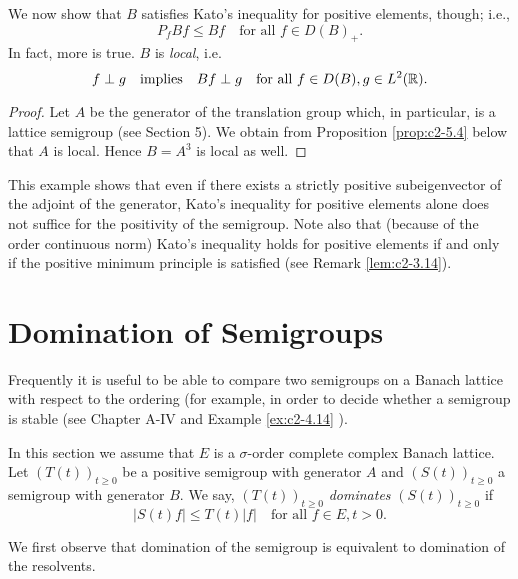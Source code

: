 We now show that $B$ satisfies Kato's inequality for positive elements, though; i.e.,
\begin{equation}\label{eq:c2-3.20}
P_{f} Bf \leq Bf \quad \text{for all } f \in D(B)_{+}.
\end{equation}
In fact, more is true. $B$ is \emph{local}, i.e.
\begin{equation}\label{eq:c2-3.21}
f \perp g \quad \text{implies} \quad Bf \perp g \quad \text{for all } f \in D(B), g \in L^{2}(\mathbb{R}).
\end{equation}

\begin{proof}
Let $A$ be the generator of the translation group which, in particular, is a lattice semigroup (see Section 5). We obtain from Proposition \ref{prop:c2-5.4} below that $A$ is local. 
Hence $B = A^{3}$ is local as well.
\end{proof}
This example shows that even if there exists a strictly positive subeigenvector of the adjoint of the generator, Kato's inequality for positive elements alone does not suffice for the positivity of the semigroup. 
Note also that (because of the order continuous norm) Kato's inequality holds for positive elements if and only if the positive minimum principle is satisfied (see Remark \ref{lem:c2-3.14}).

\section{Domination of Semigroups} \label{sec:c2-4}

Frequently it is useful to be able to compare two semigroups on a
Banach lattice with respect to the ordering (for example, in order to
decide whether a semigroup is stable (see Chapter A-IV and Example \ref{ex:c2-4.14}   ).

In this section we assume that $E$ is a $\sigma$-order complete complex Banach lattice. 
Let $(T(t))_{t \geq 0}$ be a positive semigroup with generator $A$ and $(S(t))_{t \geq 0}$ a semigroup with generator $B$. 
We say, $(T(t))_{t \geq 0}$ \emph{dominates} $(S(t))_{t \geq 0}$ if
\begin{equation}\label{eq:c2-4.1}
|S(t)f| \leq T(t)|f| \quad \text{for all } f \in E, t > 0.
\end{equation}

We first observe that domination of the semigroup is equivalent to domination of the resolvents.

